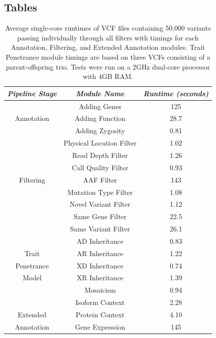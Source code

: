 \documentclass[twocolumn]{bmcart}%
\begin{document}
\begin{backmatter}

\section*{Tables}

\begin{table}[h!]
\begin{tabular}{| c | *2c |} \hline %
\emph{Pipeline Stage} & \emph{Module Name} & \emph{Runtime (seconds)} \\
\hline
             & Adding Genes     & 125\\
Annotation   & Adding Function & 28.7\\
             & Adding Zygosity & 0.81\\
\hline
             & Physical Location Filter & 1.02 \\
             & Read Depth Filter        & 1.26 \\
             & Call Quality Filter      & 0.93\\
Filtering    & AAF Filter               & 143\\
             & Mutation Type Filter     & 1.08\\
             & Novel Variant Filter     & 1.12\\
             & Same Gene Filter       & 22.5\\
             & Same Variant Filter    & 26.1\\
\hline
             & AD Inheritance    & 0.83\\
 Trait       & AR Inheritance    & 1.22\\
Penetrance   & XD Inheritance    & 0.74\\
  Model      & XR Inheritance    & 1.39\\
             & Mosaicism         & 0.94\\
\hline
                 & Isoform Context      & 2.28\\
   Extended      & Protein Context      & 4.10\\
 Annotation      & Gene Expression      & 145\\
\hline
\end{tabular}
\vspace{1ex}
\caption{Average single-core runtimes of VCF files containing 50,000 variants passing individually through all filters with timings for each Annotation, Filtering, and Extended Annotation modules. Trait Penetrance module timings are based on three VCFs consisting of a parent-offspring trio. Tests were run on a 2GHz dual-core processor with 4GB RAM.}\label{table:results}
\end{table}





\end{backmatter}
\end{document}
